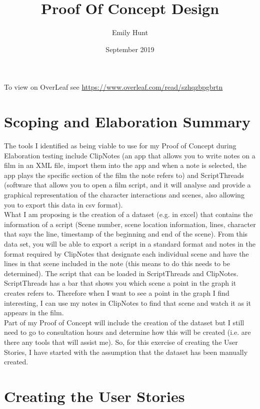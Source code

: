 \documentclass{article}
\title{\textbf{Proof Of Concept Design}}
\author{Emily Hunt}
\date{September 2019}
\begin{document}
\maketitle

To view on OverLeaf see \url{https://www.overleaf.com/read/szhqzbpgbrtn}

\section{Scoping and Elaboration Summary}
The tools I identified as being viable to use for my Proof of Concept during Elaboration testing include ClipNotes (an app that allows you to write notes on a film in an XML file, import them into the app and when a note is selected, the app plays the specific section of the film the note refers to) and ScriptThreads (software that allows you to open a film script, and it will analyse and provide a graphical representation of the character interactions and scenes, also allowing you to export this data in csv format).\\
What I am proposing is the creation of a dataset (e.g. in excel) that contains the information of a script (Scene number, scene location information, lines, character that says the line, timestamp of the beginning and end of the scene). From this data set, you will be able to export a script in a standard format and notes in the format required by ClipNotes that designate each individual scene and have the lines in that scene included in the note (this means to do this needs to be determined). The script that can be loaded in ScriptThreads and ClipNotes. ScriptThreads has a bar that shows you which scene a point in the graph it creates refers to. Therefore when I want to see a point in the graph I find interesting, I can use my notes in ClipNotes to find that scene and watch it as it appears in the film.\\
Part of my Proof of Concept will include the creation of the dataset but I still need to go to consultation hours and determine how this will be created (i.e. are there any tools that will assist me). So, for this exercise of creating the User Stories, I have started with the assumption that the dataset has been manually created.


\section{Creating the User Stories}
\end{document}
